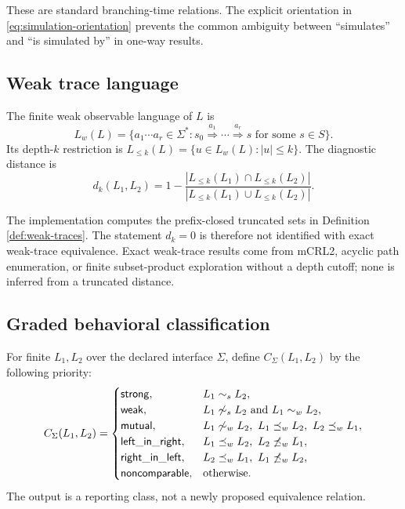 \documentclass{ws-jbcb}
\numberwithin{equation}{section}
\newcommand{\xRightarrow}[1]{\stackrel{#1}{\Longrightarrow}}
\newcommand{\strongsim}{\mathrel{\sim_{s}}}
\newcommand{\weaksim}{\mathrel{\sim_{w}}}
\newcommand{\weakpre}{\mathrel{\preceq_{w}}}
\begin{document}
These are standard branching-time relations.\cite{Milner1989,Sangiorgi2011}
The explicit orientation in \eqref{eq:simulation-orientation} prevents the common
ambiguity between ``simulates'' and ``is simulated by'' in one-way results.

\subsection{Weak trace language}\label{sec:trace-language}

\begin{definition}\label{def:weak-traces}
The finite weak observable language of $L$ is
\begin{equation}\label{eq:exact-language}
 L_w(L)=\{a_1\cdots a_r\in\Sigma^*:s_0
 \xRightarrow{a_1}\cdots\xRightarrow{a_r}s
 \text{ for some }s\in S\}.
\end{equation}
Its depth-$k$ restriction is
$L_{\leq k}(L)=\{u\in L_w(L):|u|\leq k\}$. The diagnostic distance is
\begin{equation}\label{eq:distance}
d_k(L_1,L_2)=1-
\frac{|L_{\leq k}(L_1)\cap L_{\leq k}(L_2)|}
{|L_{\leq k}(L_1)\cup L_{\leq k}(L_2)|}.
\end{equation}
\end{definition}

The implementation computes the prefix-closed truncated sets in Definition
\ref{def:weak-traces}. The statement $d_k=0$ is therefore not identified with
exact weak-trace equivalence. Exact weak-trace results come from mCRL2, acyclic path enumeration,
or finite subset-product exploration without a depth cutoff; none is inferred
from a truncated distance.

\subsection{Graded behavioral classification}\label{sec:decision}

\begin{definition}\label{def:classifier}
For finite $L_1,L_2$ over the declared interface $\Sigma$, define
$C_{\Sigma}(L_1,L_2)$ by the following priority:
\begin{equation}\label{eq:classifier}
C_{\Sigma}(L_1,L_2)=
\begin{cases}
\mathsf{strong}, & L_1\strongsim L_2,\\
\mathsf{weak}, & L_1\not\strongsim L_2\text{ and }L_1\weaksim L_2,\\
\mathsf{mutual}, & L_1\not\weaksim L_2,\ L_1\weakpre L_2,\ L_2\weakpre L_1,\\
\mathsf{left\_in\_right}, & L_1\weakpre L_2,\ L_2\not\weakpre L_1,\\
\mathsf{right\_in\_left}, & L_2\weakpre L_1,\ L_1\not\weakpre L_2,\\
\mathsf{noncomparable}, & \text{otherwise}.
\end{cases}
\end{equation}
The output is a reporting class, not a newly proposed equivalence relation.
\end{definition}
\end{document}
